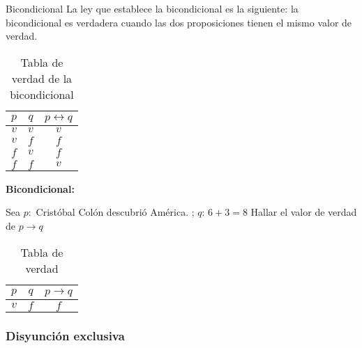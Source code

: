 \begin{defi}{ Bicondicional}{} La ley que establece la bicondicional
es la siguiente: la bicondicional es verdadera cuando las dos proposiciones
tienen el mismo valor de verdad.\end{defi}

\begin{table}[H]
\centering

\caption{Tabla de verdad de la bicondicional}

\setlength\arrayrulewidth{1pt} 

\begin{tabular}{c|c|c}
\arrayrulecolor{ptctitle}\hline\cellcolor{ptctitle!50}$p$ &
\cellcolor{ptctitle!50}$q$ &
\cellcolor{ptctitle!50}$p\longleftrightarrow q$\tabularnewline
\hline\cellcolor{ptcbackground}$v$ &
\cellcolor{ptcbackground} $v$ &
\cellcolor{ptcbackground}$v$\tabularnewline
\hline\cellcolor{gray!50}$v$ &
\cellcolor{gray!50} $f$ &
\cellcolor{gray!50}$f$\tabularnewline
\hline\cellcolor{ptcbackground}$f$ &
\cellcolor{ptcbackground} $v$ &
\cellcolor{ptcbackground}$f$\tabularnewline
\hline\cellcolor{gray!50}$f$ &
\cellcolor{gray!50} $f$ &
\cellcolor{gray!50}$v$\tabularnewline
\end{tabular}
\end{table}

\begin{ejemplo}{\bf Bicondicional:}

Sea $p:$ Cristóbal Colón descubrió América. ; $q:\,6+3=8$ Hallar
el valor de verdad de $p\rightarrow q$ \end{ejemplo}

\solu

\begin{table}[H]
\centering

\caption{Tabla de verdad}

\begin{tabular}{c|c|c}
\arrayrulecolor{ptctitle}\cellcolor{gray!50}$p$ &
\cellcolor{gray!50}$q$ &
\cellcolor{gray!50}$p\rightarrow q$\tabularnewline
\hline 
\cellcolor{ptcbackground}$v$ &
\cellcolor{ptcbackground}$f$ &
\cellcolor{ptcbackground}$f$\tabularnewline
\hline 
\end{tabular}
\end{table}


\subsubsection{Disyunción exclusiva}

